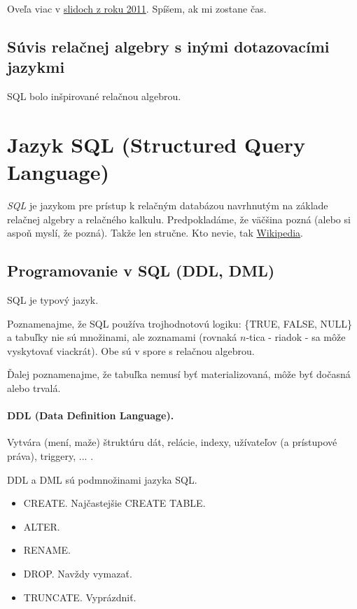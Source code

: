 \documentclass[10pt,a4paper]{article}
\begin{document}
Oveľa viac v \href{http://www.dcs.fmph.uniba.sk/~plachetk/TEACHING/DB2011/db2011_5.pdf}{slidoch z roku 2011}. Spíšem, ak mi zostane čas. 


\subsection{Súvis relačnej algebry s inými dotazovacími jazykmi}
\label{relacna_algebra_suvis}

SQL bolo inšpirované relačnou algebrou. 
    
\section{Jazyk SQL (Structured Query Language)} 
\emph{SQL} je jazykom pre prístup k relačným databázou navrhnutým na základe relačnej algebry a relačného kalkulu. 
Predpokladáme, že väčšina pozná (alebo si aspoň myslí, že pozná). Takže len stručne. 
Kto nevie, tak \href{http://en.wikipedia.org/wiki/SQL}{Wikipedia}. 

\subsection{Programovanie v SQL (DDL, DML)}

SQL je typový jazyk.

Poznamenajme, že SQL používa trojhodnotovú logiku: \{TRUE, FALSE, NULL\}
a tabuľky nie sú množinami, ale zoznamami (rovnaká $n$-tica - riadok - sa môže vyskytovať viackrát). Obe sú v spore s relačnou algebrou. 

Ďalej poznamenajme, že tabuľka nemusí byť materializovaná, môže byť dočasná alebo trvalá. 

\paragraph{DDL (Data Definition Language).}
Vytvára (mení, maže) štruktúru dát, relácie, indexy, užívateľov (a prístupové práva), triggery, ... . 

DDL a DML sú podmnožinami jazyka SQL. 

\begin{itemize}
\item CREATE. Najčastejšie CREATE TABLE.
\item ALTER. 
\item RENAME.
\item DROP. Navždy vymazať. 
\item TRUNCATE. Vyprázdniť. 
\end{itemize}
\end{document}
